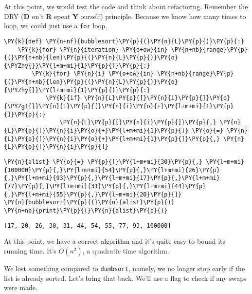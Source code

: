 At this point, we would test the code and think about refactoring.  Remember the DRY (\textbf{D} on't \textbf{R} epeat \textbf{Y} ourself) principle.  Because we know how many times to loop, we could just use a \texttt{for} loop.  

\begin{Verbatim}[commandchars=\\\{\}]
\PY{k}{def} \PY{n+nf}{bubblesort}\PY{p}{(}\PY{n}{L}\PY{p}{)}\PY{p}{:}
    \PY{k}{for} \PY{n}{iteration} \PY{o+ow}{in} \PY{n+nb}{range}\PY{p}{(}\PY{n+nb}{len}\PY{p}{(}\PY{n}{L}\PY{p}{)}\PY{o}{\PYZhy{}}\PY{l+m+mi}{1}\PY{p}{)}\PY{p}{:}
        \PY{k}{for} \PY{n}{i} \PY{o+ow}{in} \PY{n+nb}{range}\PY{p}{(}\PY{n+nb}{len}\PY{p}{(}\PY{n}{L}\PY{p}{)}\PY{o}{\PYZhy{}}\PY{l+m+mi}{1}\PY{p}{)}\PY{p}{:}
            \PY{k}{if} \PY{n}{L}\PY{p}{[}\PY{n}{i}\PY{p}{]}\PY{o}{\PYZgt{}}\PY{n}{L}\PY{p}{[}\PY{n}{i}\PY{o}{+}\PY{l+m+mi}{1}\PY{p}{]}\PY{p}{:}
                \PY{n}{L}\PY{p}{[}\PY{n}{i}\PY{p}{]}\PY{p}{,} \PY{n}{L}\PY{p}{[}\PY{n}{i}\PY{o}{+}\PY{l+m+mi}{1}\PY{p}{]} \PY{o}{=} \PY{n}{L}\PY{p}{[}\PY{n}{i}\PY{o}{+}\PY{l+m+mi}{1}\PY{p}{]}\PY{p}{,} \PY{n}{L}\PY{p}{[}\PY{n}{i}\PY{p}{]}
\end{Verbatim}



\begin{Verbatim}[commandchars=\\\{\}]
\PY{n}{alist} \PY{o}{=} \PY{p}{[}\PY{l+m+mi}{30}\PY{p}{,} \PY{l+m+mi}{100000}\PY{p}{,}\PY{l+m+mi}{54}\PY{p}{,}\PY{l+m+mi}{26}\PY{p}{,}\PY{l+m+mi}{93}\PY{p}{,}\PY{l+m+mi}{17}\PY{p}{,}\PY{l+m+mi}{77}\PY{p}{,}\PY{l+m+mi}{31}\PY{p}{,}\PY{l+m+mi}{44}\PY{p}{,}\PY{l+m+mi}{55}\PY{p}{,}\PY{l+m+mi}{20}\PY{p}{]}
\PY{n}{bubblesort}\PY{p}{(}\PY{n}{alist}\PY{p}{)}
\PY{n+nb}{print}\PY{p}{(}\PY{n}{alist}\PY{p}{)}
\end{Verbatim}

\begin{Verbatim}
[17, 20, 26, 30, 31, 44, 54, 55, 77, 93, 100000]
\end{Verbatim}


At this point, we have a correct algorithm and it's quite easy to bound its running time.  It's $O(n^2)$, a quadratic time algorithm.


We lost something compared to \texttt{dumbsort}, namely, we no longer stop early if the list is already sorted.  Let's bring that back.  We'll use a flag to check if any swaps were made.  


